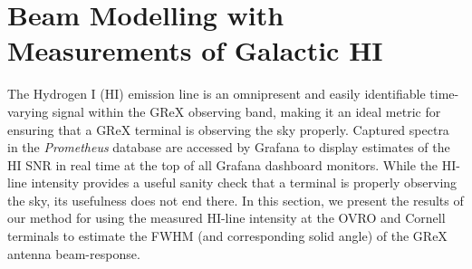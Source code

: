 \section{Beam Modelling with Measurements of Galactic HI}
\label{sec:beam_model}

The Hydrogen I (HI) emission line is an omnipresent and easily identifiable time-varying signal within the GReX observing band, making it an ideal metric for ensuring that a GReX terminal is observing the sky properly. 
Captured spectra in the \textit{Prometheus} database are accessed by Grafana to display estimates of the HI SNR in real time at the top of all Grafana dashboard monitors. 
While the HI-line intensity provides a useful sanity check that a terminal is properly observing the sky, its usefulness does not end there.
In this section, we present the results of our method for using the measured HI-line intensity at the OVRO and Cornell terminals to estimate the FWHM (and corresponding solid angle) of the GReX antenna beam-response.

